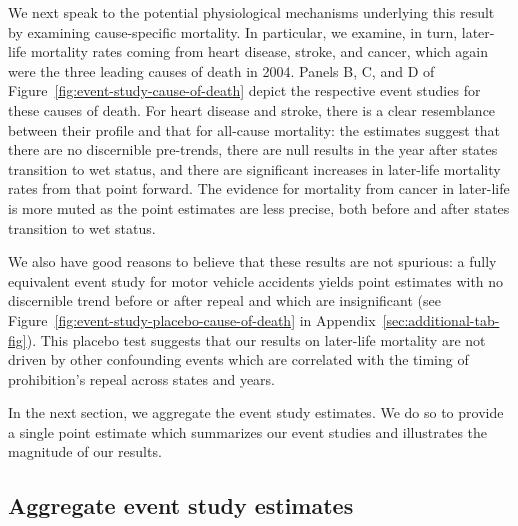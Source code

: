\documentclass[12pt]{article}
\begin{document}
We next speak to the potential physiological mechanisms underlying this result by examining cause-specific mortality. 
In particular, we examine, in turn, later-life mortality rates coming from heart disease, stroke, and cancer, which again were the three leading causes of death in 2004. 
Panels B, C, and D of Figure~\ref{fig:event-study-cause-of-death} depict the respective event studies for these causes of death. 
For heart disease and stroke, there is a clear resemblance between their profile and that for all-cause mortality: the estimates suggest that there are no discernible pre-trends, there are null results in the year after states transition to wet status, and there are significant increases in later-life mortality rates from that point forward. 
The evidence for mortality from cancer in later-life is more muted as the point estimates are less precise, both before and after states transition to wet status. 

We also have good reasons to believe that these results are not spurious: a fully equivalent event study for motor vehicle accidents yields point estimates with no discernible trend before or after repeal and which are insignificant (see Figure~\ref{fig:event-study-placebo-cause-of-death} in Appendix~\ref{sec:additional-tab-fig}). 
This placebo test suggests that our results on later-life mortality are not driven by other confounding events which are correlated with the timing of prohibition's repeal across states and years.

In the next section, we aggregate the event study estimates. 
We do so to provide a single point estimate which summarizes our event studies and illustrates the magnitude of our results. 

\subsection{Aggregate event study estimates}\label{sec:results-aggregate}
\end{document}
